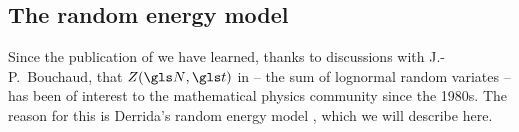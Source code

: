 %
%

\subsection{The random energy model}
Since the publication of \cite{PetersKlein2013} we have learned, thanks to discussions with J.-P.~Bouchaud, that $Z(\N,\t)$ in  -- the sum of lognormal random variates -- has been of interest to the mathematical physics community since the 1980s. The reason for this is Derrida's random energy model \cite{Derrida1980,Derrida1981}, which we will describe here.

